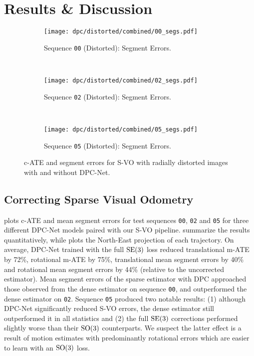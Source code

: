 \section{Results \& Discussion}
\begin{figure}
    \centering
    \begin{subfigure}{0.42\textwidth}
        \texttt{[image: dpc/distorted/combined/00\_segs.pdf]}
        \label{00-pose-segs}
        \caption{Sequence \texttt{00} (Distorted): Segment Errors.}
    \end{subfigure} 
    ~
    \begin{subfigure}{0.42\textwidth}
        \texttt{[image: dpc/distorted/combined/02\_segs.pdf]}
        \label{02-pose-segs}
        \caption{Sequence \texttt{02} (Distorted): Segment Errors.}
    \end{subfigure} 
    ~
    \begin{subfigure}{0.42\textwidth}
        \texttt{[image: dpc/distorted/combined/05\_segs.pdf]}
        \label{05-pose-segs}
        \caption{Sequence \texttt{05} (Distorted): Segment Errors.}
    \end{subfigure} 
   \caption{c-ATE and segment errors for S-VO with radially distorted images with and without DPC-Net.}
  \label{fig:cum-seg-errs-distorted} 
\end{figure}

\subsection{Correcting Sparse Visual Odometry}
 plots c-ATE and mean segment errors for test sequences \texttt{00},  \texttt{02} and  \texttt{05} for three different DPC-Net models paired with our S-VO pipeline.  summarize the results quantitatively, while  plots the North-East projection of each trajectory.  On average, DPC-Net trained with the full $\mathrm{SE}(3)$ loss reduced translational m-ATE by 72\%, rotational m-ATE by 75\%, translational mean segment errors by 40\% and rotational mean segment errors by 44\% (relative to the uncorrected estimator). Mean segment errors of the sparse estimator with DPC approached those observed from the dense estimator on sequence \texttt{00}, and outperformed the dense estimator on \texttt{02}. Sequence \texttt{05} produced two notable results: (1) although DPC-Net significantly reduced S-VO errors, the dense estimator still outperformed it in all statistics and (2) the full $\mathrm{SE}(3)$ corrections performed slightly worse than their $\mathrm{SO}(3)$ counterparts. We suspect the latter effect is a result of motion estimates with predominantly rotational errors which are easier to learn with an $\mathrm{SO}(3)$ loss.

